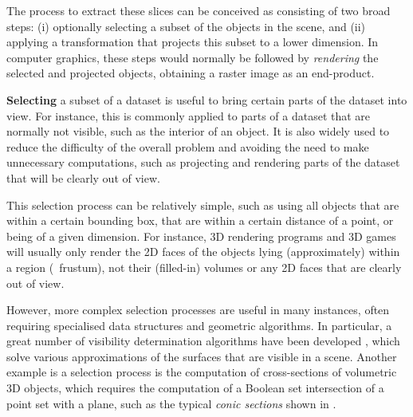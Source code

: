 The process to extract these slices can be conceived as consisting of two broad steps: (i) optionally selecting a subset of the objects in the scene, and (ii) applying a transformation that projects this subset to a lower dimension.
In computer graphics, these steps would normally be followed by \emph{rendering} the selected and projected objects, obtaining a raster image as an end-product.

\textbf{Selecting} a subset of a dataset is useful to bring certain parts of the dataset into view.
For instance, this is commonly applied to parts of a dataset that are normally not visible, such as the interior of an object.
It is also widely used to reduce the difficulty of the overall problem and avoiding the need to make unnecessary computations, such as projecting and rendering parts of the dataset that will be clearly out of view.

This selection process can be relatively simple, such as using all objects that are within a certain bounding box, that are within a certain distance of a point, or being of a given dimension.
For instance, 3D rendering programs and 3D games will usually only render the 2D faces of the objects lying (approximately) within a region (\eg\ frustum), not their (filled-in) volumes or any 2D faces that are clearly out of view.

However, more complex selection processes are useful in many instances, often requiring specialised data structures and geometric algorithms.
In particular, a great number of visibility determination algorithms have been developed \citep[Ch.~36]{Hughes14}, which solve various approximations of the surfaces that are visible in a scene.
Another example is a selection process is the computation of cross-sections of volumetric 3D objects, which requires the computation of a Boolean set intersection of a point set with a plane, such as the typical \emph{conic sections} shown in .

